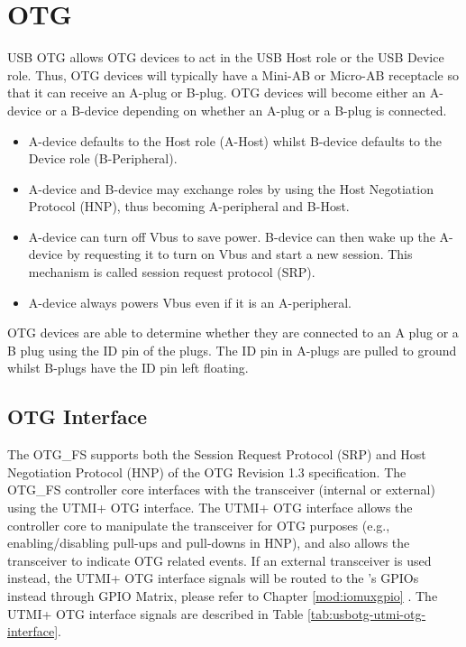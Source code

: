 \documentclass[main\_\_EN.tex]{subfiles}
\begin{document}
\section{OTG}

USB OTG allows OTG devices to act in the USB Host role or the USB Device role. Thus, OTG devices will typically have a Mini-AB or Micro-AB receptacle so that it can receive an A-plug or B-plug. OTG devices will become either an A-device or a B-device depending on whether an A-plug or a B-plug is connected.

\begin{itemize}
    \item A-device defaults to the Host role (A-Host) whilst B-device defaults to the Device role (B-Peripheral).
    \item A-device and B-device may exchange roles by using the Host Negotiation Protocol (HNP), thus becoming A-peripheral and B-Host.
    \item A-device can turn off Vbus to save power. B-device can then wake up the A-device by requesting it to turn on Vbus and start a new session. This mechanism is called session request protocol (SRP).
    \item A-device always powers Vbus even if it is an A-peripheral.
\end{itemize}

OTG devices are able to determine whether they are connected to an A plug or a B plug using the ID pin of the plugs. The ID pin in A-plugs are pulled to ground whilst B-plugs have the ID pin left floating.



\subsection{OTG Interface}

The OTG\_FS supports both the Session Request Protocol (SRP) and Host Negotiation Protocol (HNP) of the OTG Revision 1.3 specification. The OTG\_FS controller core interfaces with the transceiver (internal or external) using the UTMI+ OTG interface. The UTMI+ OTG interface allows the controller core to manipulate the transceiver for OTG purposes (e.g., enabling/disabling pull-ups and pull-downs in HNP), and also allows the transceiver to indicate OTG related events. If an external transceiver is used instead, the UTMI+ OTG interface signals will be routed to the \chipname{}'s GPIOs instead through GPIO Matrix, please refer to Chapter \ref{mod:iomuxgpio} \textit{}. The UTMI+ OTG interface signals are described in Table \ref{tab:usbotg-utmi-otg-interface}.
\end{document}
